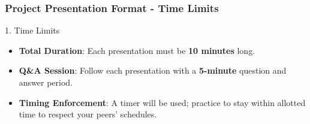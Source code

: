 \documentclass[aspectratio=169]{beamer}
\begin{document}
\begin{frame}[fragile]
    \frametitle{Project Presentation Format - Time Limits}
    \begin{block}{1. Time Limits}
        \begin{itemize}
            \item \textbf{Total Duration}: Each presentation must be \textbf{10 minutes} long.
            \item \textbf{Q\&A Session}: Follow each presentation with a \textbf{5-minute} question and answer period.
            \item \textbf{Timing Enforcement}: A timer will be used; practice to stay within allotted time to respect your peers' schedules.
        \end{itemize}
    \end{block}
\end{frame}
\end{document}
